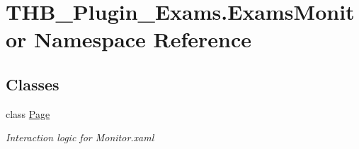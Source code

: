 \hypertarget{namespace_t_h_b___plugin___exams_1_1_exams_monitor}{}\section{T\+H\+B\+\_\+\+Plugin\+\_\+\+Exams.\+Exams\+Monitor Namespace Reference}
\label{namespace_t_h_b___plugin___exams_1_1_exams_monitor}
\subsection*{Classes}
\begin{DoxyCompactItemize}
\item 
class \mbox{\hyperlink{class_t_h_b___plugin___exams_1_1_exams_monitor_1_1_page}{Page}}
\begin{DoxyCompactList}\small\item\em Interaction logic for Monitor.\+xaml \end{DoxyCompactList}\end{DoxyCompactItemize}
